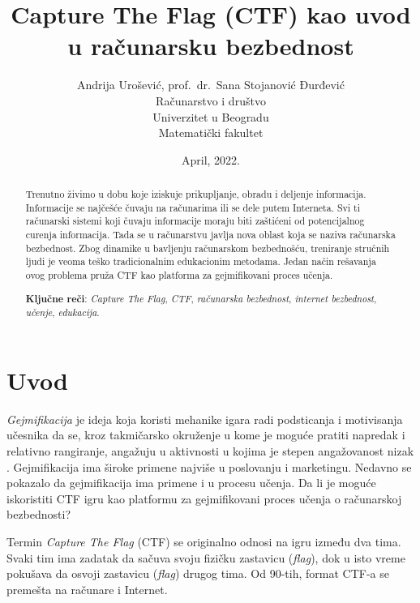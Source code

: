 \documentclass[12pt, a4paper, twocolumn]{article}
\title{Capture The Flag (CTF) kao uvod u računarsku bezbednost}
\author{Andrija Urošević, prof.\ dr.\ Sana Stojanović Đurđević\\Računarstvo i društvo\\Univerzitet u Beogradu\\Matematički fakultet}
\date{April, 2022.}
\begin{document}
\maketitle

\begin{abstract}
    Trenutno živimo u dobu koje iziskuje prikupljanje, obradu i deljenje 
    informacija. Informacije se najčešće čuvaju na računarima ili se dele
    putem Interneta. Svi ti računarski sistemi koji čuvaju informacije moraju
    biti zaštićeni od potencijalnog curenja informacija. Tada se u računarstvu
    javlja nova oblast koja se naziva računarska bezbednost. Zbog dinamike u 
    bavljenju računarskom bezbednošću, treniranje stručnih ljudi je veoma
    teško tradicionalnim edukacionim metodama. Jedan način rešavanja ovog 
    problema pruža CTF kao platforma za gejmifikovani proces učenja.

    \textbf{Ključne reči}: \emph{Capture The Flag}, \emph{CTF}, 
    \emph{računarska bezbednost}, \emph{internet bezbednost}, \emph{učenje}, 
    \emph{edukacija}.
\end{abstract}

\section{Uvod}

\emph{Gejmifikacija} je ideja koja koristi mehanike igara radi podsticanja i
motivisanja učesnika da se, kroz takmičarsko okruženje u kome je moguće 
pratiti napredak i relativno rangiranje, angažuju u aktivnosti u kojima je
stepen angažovanost nizak \cite{ctf_gami3}. Gejmifikacija ima široke primene
najviše u poslovanju i marketingu. Nedavno se pokazalo da gejmifikacija
ima primene i u procesu učenja. Da li je moguće iskoristiti CTF igru kao
platformu za gejmifikovani proces učenja o računarskoj bezbednosti?

Termin \emph{Capture The Flag} (CTF) se originalno odnosi na igru između dva
tima. Svaki tim ima zadatak da sačuva svoju fizičku zastavicu (\emph{flag}), 
dok u isto vreme pokušava da osvoji zastavicu (\emph{flag}) drugog tima.
Od 90-tih, format CTF-a se premešta na računare i Internet. 
\end{document}
